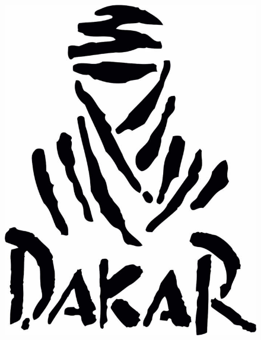 \newcommand{\graficarDatosMio}[6]{
  \begin{tikzpicture}
  \begin{axis}[
      title={#1},
      xlabel={#2},
      ylabel={#3},
      scaled x ticks=false,
      scaled y ticks=false,
      width=0.6\textwidth
  ]
  \addplot[only marks, color=black] table[x=#4,y=#5]{#6};
  \end{axis}
\end{tikzpicture}
}

\newcommand{\graficarDatosSinOutliers}[8]{
  \begin{tikzpicture}
  \begin{axis}[
      title={#1},
      xlabel={#2},
      ylabel={#3},
      scaled x ticks=false,
      scaled y ticks=false,
      width=0.6\textwidth,
      ymin=#7,
      ymax=#8,
      restrict y to domain=#7:#8
  ]
  \addplot[only marks, color=black] table[x=#4,y=#5]{#6};
  \end{axis}
\end{tikzpicture}
}


\begin{figure}[h]
\begin{center}
\includegraphics[scale=0.2]{imagenes/dakar.jpg}
\end{center}
\end{figure}

